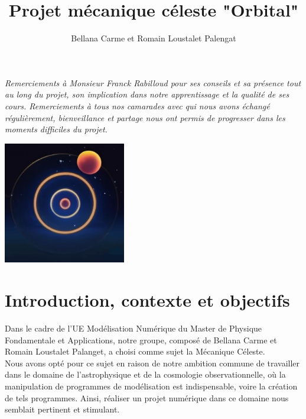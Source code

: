 \documentclass[11pt]{article}
\begin{document}
\begin{titlepage}
\title{Projet mécanique céleste "Orbital"}
\author{Bellana Carme et Romain Loustalet Palengat}

\end{titlepage}
\maketitle
\vspace{1cm}
\begin{center}
{\Large\itshape Remerciements à Monsieur Franck Rabilloud pour ses conseils et sa présence tout au long du projet, son implication dans notre apprentissage et la qualité de ses cours. Remerciements à tous nos camarades avec qui nous avons échangé régulièrement, bienveillance et partage nous ont permis de progresser dans les moments difficiles du projet. \par}
\vspace{2cm}
\includegraphics[width=0.4\textwidth]{logo_orbital.png}

\vfill
\end{center}
\newpage

\tableofcontents

\section{Introduction, contexte et objectifs}

Dans le cadre de l'UE Modélisation Numérique du Master de Physique Fondamentale et Applications, notre groupe, composé de Bellana Carme et Romain Loustalet Palanget, a choisi comme sujet la Mécanique Céleste.\\

Nous avons opté pour ce sujet en raison de notre ambition commune de travailler dans le domaine de l'astrophysique et de la cosmologie observationnelle, où la manipulation de programmes de modélisation est indispensable, voire la création de tels programmes. Ainsi, réaliser un projet numérique dans ce domaine nous semblait pertinent et stimulant.\\
\end{document}

